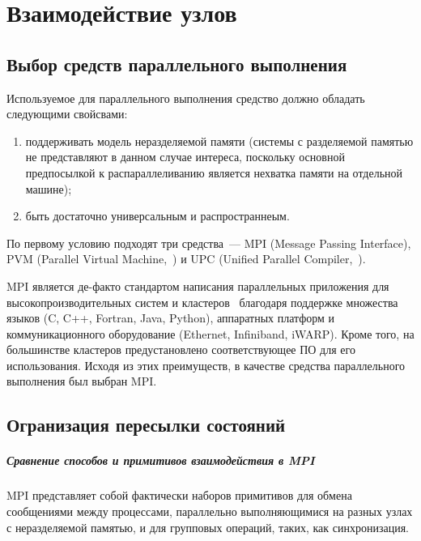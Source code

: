 \chapter{Взаимодействие узлов}
\label{cha:communication}

\section{Выбор средств параллельного выполнения}
\label{sec:parall-selection}

Используемое для параллельного выполнения средство должно обладать следующими свойсвами:
\begin{enumerate}
\item поддерживать модель неразделяемой памяти (системы с разделяемой памятью не
  представляют в данном случае интереса, поскольку основной предпосылкой к
  распараллеливанию является нехватка памяти на отдельной машине);
\item быть достаточно универсальным и распространнеым.
\end{enumerate}

По первому условию подходят три средства~--- MPI (Message Passing Interface), PVM (Parallel
Virtual Machine,~\cite{PVM}) и UPC (Unified Parallel Compiler,~\cite{UPC12}).

MPI является де-факто стандартом написания параллельных приложения для
высокопроизводительных систем и кластеров~\cite{MPI} благодаря поддержке множества языков
(C, C++, Fortran, Java, Python\etc), аппаратных платформ и коммуникационного оборудование
(Ethernet, Infiniband, iWARP\etc). Кроме того, на большинстве кластеров предустановлено
соответствующее ПО для его использования. Исходя из этих преимуществ, в качестве средства
параллельного выполнения был выбран MPI.

\section{Огранизация пересылки состояний}
\label{sec:mpi-interaction}

\paragraph{Сравнение способов и примитивов взаимодействия в MPI}
\label{sec:mpi-primitives}

MPI представляет собой фактически наборов примитивов для обмена сообщениями между
процессами, параллельно выполняющимися на разных узлах с неразделяемой памятью, и для
групповых операций, таких, как синхронизация.

